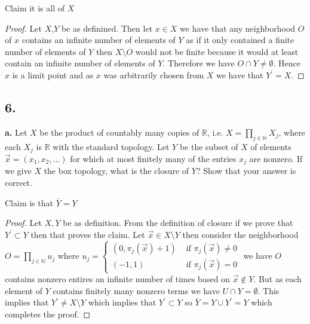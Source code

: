 \documentclass{amsart}
\theoremstyle{plain}
\theoremstyle{definition}
\theoremstyle{remark}
\begin{document}
Claim it is all of $X$ 

\begin{proof}
    Let $X$,$Y$ be as definined. Then let $x\in X$ we have that any neighborhood $O$ of $x$ contains an infinite number of elements of $Y$ as if it only contained a finite number of elements of $Y$ then $X\setminus O$ would not be finite because it would at least contain an infinite number of elements of $Y$. Therefore we have $O\cap Y\not = \emptyset$. Hence $x$ is a limit point and as $x$ was arbitrarily chosen from $X$ we have that $Y^\prime=X$.
\end{proof}

\vspace{.15in}

\noindent
\subsection*{6.} 

{\bfseries a.} Let $X$ be the product of countably many copies of $\mathbb R$, i.e. $X = \prod _{j\in \mathbb N } X_j$, where each $X_j$ is $\mathbb R$ with the standard topology. Let $Y$ be the subset of $X$ of elements $\vec{x} = ( x_1 , x_2 , . . . )$ for which at most finitely many of the entries $x_j$ are nonzero. If we give $X$ the box topology, what is the closure of $Y$? Show that your answer is correct. 

Claim is that $\bar Y=Y$

\begin{proof}
    Let $X,Y$ be as definition. From the definition of closure if we prove that $Y^\prime \subset Y$ then that proves the claim. Let  $\vec x\in X\setminus Y$ then consider the neighborhood $O=\prod_{j\in \mathbb{N}}u_j$ where $u_j=\begin{cases}
        (0,\pi_j(\vec x)+1)& \text{ if } \pi_j(\vec x)\not =0\\
        (-1,1) & \text{ if } \pi_j(\vec x) = 0
    \end{cases}$
    we have $O$ contains nonzero entires an infinite number of times based on $\vec x\not \in Y$. But as each element of $Y$ contains finitely many nonzero terms we have $U\cap Y=\emptyset$. This implies that $Y^\prime \not = X\setminus Y$ which implies that $Y^\prime\subset Y$ so $\bar Y=Y\cup Y^\prime = Y$ which completes the proof. 



\end{proof}


\vspace{.1in}
\end{document}
